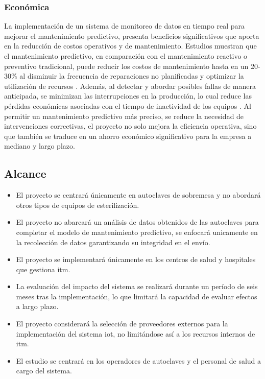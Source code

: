 \subsubsection*{Económica}
La implementación de un sistema de monitoreo de datos en tiempo real para mejorar el mantenimiento predictivo, presenta beneficios significativos que aporta en la reducción de costos operativos y de mantenimiento. Estudios muestran que el mantenimiento predictivo, en comparación con el mantenimiento reactivo o preventivo tradicional, puede reducir los costos de mantenimiento hasta en un 20-30\% al disminuir la frecuencia de reparaciones no planificadas y optimizar la utilización de recursos \citep{Mobley2002}. Además, al detectar y abordar posibles fallas de manera anticipada, se minimizan las interrupciones en la producción, lo cual reduce las pérdidas económicas asociadas con el tiempo de inactividad de los equipos \cite{Schneider2015}. Al permitir un mantenimiento predictivo más preciso, se reduce la necesidad de intervenciones correctivas, el proyecto no solo mejora la eficiencia operativa, sino que también se traduce en un ahorro económico significativo para la empresa a mediano y largo plazo.

\subsection*{Alcance}
\begin{itemize}
    \item El proyecto se centrará únicamente en autoclaves de sobremesa y no abordará otros tipos de equipos de esterilización.
    \item El proyecto no abarcará un análisis de datos obtenidos de las autoclaves para completar el modelo de mantenimiento predictivo, se enfocará unicamente en la recolección de datos garantizando su integridad en el envío.
    \item El proyecto se implementará únicamente en los centros de salud y hospitales que gestiona \acrshort{itm}.
    \item La evaluación del impacto del sistema se realizará durante un período de seis meses tras la implementación, lo que limitará la capacidad de evaluar efectos a largo plazo.
    \item El proyecto considerará la selección de proveedores externos para la implementación del sistema \acrshort{iot}, no limitándose así a los recursos internos de \acrshort{itm}.
    \item El estudio se centrará en los operadores de autoclaves y el personal de salud a cargo del sistema.
\end{itemize}

